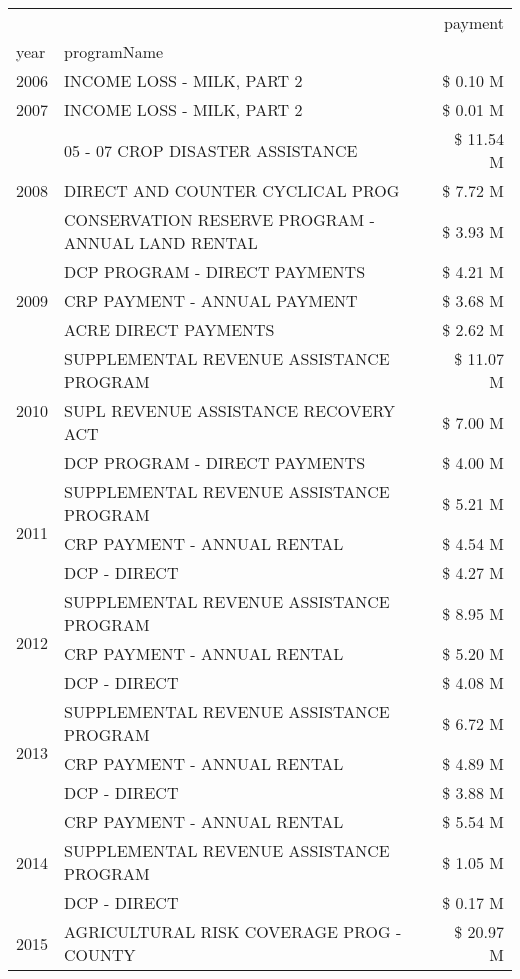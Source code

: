 \begin{tabular}{llr}
\toprule
 &  & payment \\
year & programName &  \\
\midrule
2006 & INCOME LOSS - MILK, PART 2 & \$ 0.10 M \\
\cline{1-3}
2007 & INCOME LOSS - MILK, PART 2 & \$ 0.01 M \\
\cline{1-3}
\multirow[t]{3}{*}{2008} & 05 - 07 CROP DISASTER ASSISTANCE & \$ 11.54 M \\
 & DIRECT AND COUNTER CYCLICAL PROG & \$ 7.72 M \\
 & CONSERVATION RESERVE PROGRAM - ANNUAL LAND RENTAL & \$ 3.93 M \\
\cline{1-3}
\multirow[t]{3}{*}{2009} & DCP PROGRAM - DIRECT PAYMENTS & \$ 4.21 M \\
 & CRP PAYMENT - ANNUAL PAYMENT & \$ 3.68 M \\
 & ACRE DIRECT PAYMENTS & \$ 2.62 M \\
\cline{1-3}
\multirow[t]{3}{*}{2010} & SUPPLEMENTAL REVENUE ASSISTANCE PROGRAM & \$ 11.07 M \\
 & SUPL REVENUE ASSISTANCE RECOVERY ACT & \$ 7.00 M \\
 & DCP PROGRAM - DIRECT PAYMENTS & \$ 4.00 M \\
\cline{1-3}
\multirow[t]{3}{*}{2011} & SUPPLEMENTAL REVENUE ASSISTANCE PROGRAM & \$ 5.21 M \\
 & CRP PAYMENT - ANNUAL RENTAL & \$ 4.54 M \\
 & DCP - DIRECT & \$ 4.27 M \\
\cline{1-3}
\multirow[t]{3}{*}{2012} & SUPPLEMENTAL REVENUE ASSISTANCE PROGRAM & \$ 8.95 M \\
 & CRP PAYMENT - ANNUAL RENTAL & \$ 5.20 M \\
 & DCP - DIRECT & \$ 4.08 M \\
\cline{1-3}
\multirow[t]{3}{*}{2013} & SUPPLEMENTAL REVENUE ASSISTANCE PROGRAM & \$ 6.72 M \\
 & CRP PAYMENT - ANNUAL RENTAL & \$ 4.89 M \\
 & DCP - DIRECT & \$ 3.88 M \\
\cline{1-3}
\multirow[t]{3}{*}{2014} & CRP PAYMENT - ANNUAL RENTAL & \$ 5.54 M \\
 & SUPPLEMENTAL REVENUE ASSISTANCE PROGRAM & \$ 1.05 M \\
 & DCP - DIRECT & \$ 0.17 M \\
\cline{1-3}
\multirow[t]{3}{*}{2015} & AGRICULTURAL RISK COVERAGE PROG - COUNTY & \$ 20.97 M \\

\end{tabular}
